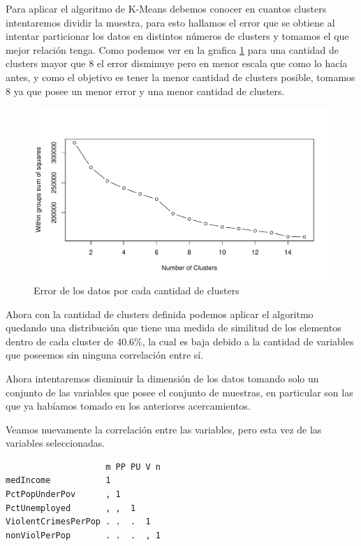 \documentclass[a4paper,10pt,twocolumn]{article}
\begin{document}
	Para aplicar el algoritmo de K-Means debemos conocer en cuantos clusters intentaremos dividir la muestra, para esto hallamos el error que se obtiene al intentar particionar los datos en distintos números de clusters y tomamos el que mejor relación tenga. Como podemos ver en la grafica \ref{fig:cluster_n_1} para una cantidad de clusters mayor que 8 el error disminuye pero en menor escala que como lo hacía antes, y como el objetivo es tener la menor cantidad de clusters posible, tomamos 8 ya que posee un menor error y una menor cantidad de clusters.

	\begin{figure}[htb]
		\begin{center}
			\includegraphics[width=\columnwidth]{figures/cluster_n_1.pdf}
		\end{center}
		\caption{Error de los datos por cada cantidad de clusters \label{fig:cluster_n_1}}%
	\end{figure}

	Ahora con la cantidad de clusters definida podemos aplicar el algoritmo quedando una distribución que tiene una medida de similitud de los elementos dentro de cada cluster de 40.6\%, la cual es baja debido a la cantidad de variables que poseemos sin ninguna correlación entre sí.

	Ahora intentaremos disminuir la dimensión de los datos tomando solo un conjunto de las variables que posee el conjunto de muestras, en particular son las que ya habíamos tomado en los anteriores acercamientos.

	Veamos nuevamente la correlación entre las variables, pero esta vez de las variables seleccionadas.

	\begin{verbatim}
                    m PP PU V n
medIncome           1          
PctPopUnderPov      , 1        
PctUnemployed       , ,  1     
ViolentCrimesPerPop . .  .  1  
nonViolPerPop       . .  .  , 1
	\end{verbatim}
\end{document}
